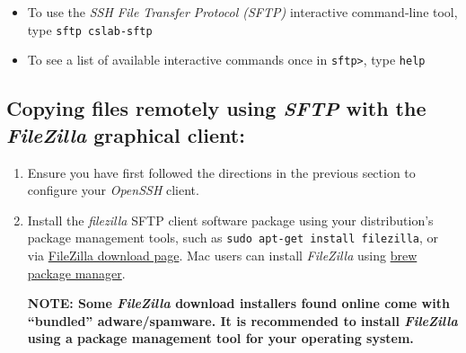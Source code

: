 \documentclass[12pt]{article}
\begin{document}
\begin{flushleft}
\begin{itemize}
  \item To use the \textit{SSH File Transfer Protocol (SFTP)} interactive command-line tool, type \break
  \verb|sftp cslab-sftp|  
\item To see a list of available interactive commands once in \verb|sftp>|, type \verb|help|
\end{itemize}

\subsection*{Copying files remotely using \textit{SFTP} with the \textit{FileZilla} graphical client:}
\begin{enumerate}
  \item Ensure you have first followed the directions in the previous section to configure your \textit{OpenSSH} client.
  \item Install the \textit{filezilla} SFTP client software package using your distribution's package management tools, such as \verb|sudo apt-get install filezilla|, or via \href{https://filezilla-project.org/download.php?show_all=1}{FileZilla download page}. Mac users can install \textit{FileZilla} using \href{http://macappstore.org/filezilla/}{brew package manager}.
    
    {\bf NOTE: Some \textit{FileZilla} download installers found online come with ``bundled'' adware/spamware. It is recommended to install \textit{FileZilla} using a package management tool for your operating system.}
    

\end{enumerate}
\end{flushleft}
\end{document}

